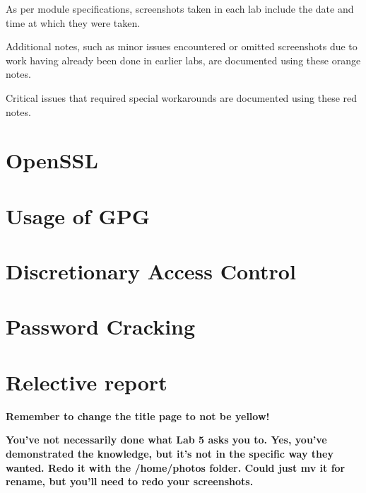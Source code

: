 \documentclass[12pt]{report}
\begin{document}
    As per module specifications, screenshots taken in each lab
    include the date and time at which they were taken.\\

    \vspace{50pt}

    \begin{tcolorbox}[colback=orange!5!white,colframe=orange!75!black,title=Example note]
        Additional notes, such as minor issues encountered or omitted screenshots due to
        work having already been done in earlier labs, are documented using these orange notes.
    \end{tcolorbox}

    \vspace{5pt}

    \begin{tcolorbox}[colback=red!5!white,colframe=red!75!black,title=Example important note]
        Critical issues that required special workarounds are documented using these red notes.
    \end{tcolorbox}


    \chapter{OpenSSL}\label{ch:lab1}
    

    \newpage

    \chapter{Usage of GPG}\label{ch:lab2}
    

    \addtocounter{chapter}{2} %
    \chapter{Discretionary Access Control}\label{ch:lab5}
    

    \chapter{Password Cracking}\label{ch:lab6}
    

    \chapter*{Relective report}\label{ch:conclusion}

    \newpage

    \large\textbf{Remember to change the title page to not be yellow!}

    \large\textbf{You've not necessarily done what Lab 5 asks you to.
    Yes, you've demonstrated the knowledge, but it's not in the specific way they wanted.
    Redo it with the /home/photos folder. Could just mv it for rename, but you'll need to
    redo your screenshots.}

    \printbibliography
\end{document}

